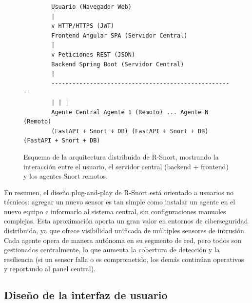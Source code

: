 \documentclass[11pt,a4paper,twoside]{report}
\begin{document}
\begin{figure}[h!]
	\centering
	\begin{verbatim}
		Usuario (Navegador Web)
		|
		v HTTP/HTTPS (JWT)
		Frontend Angular SPA (Servidor Central)
		|
		v Peticiones REST (JSON)
		Backend Spring Boot (Servidor Central)
		|
		-----------------------------------------------------
		| | |
		Agente Central Agente 1 (Remoto) ... Agente N (Remoto)
		(FastAPI + Snort + DB) (FastAPI + Snort + DB) (FastAPI + Snort + DB)
	\end{verbatim}
	\caption{Esquema de la arquitectura distribuida de R-Snort, mostrando la interacción entre el usuario, el servidor central (backend + frontend) y los agentes Snort remotos.}
	\label{fig:arquitectura}
\end{figure}

En resumen, el diseño plug-and-play de R-Snort está orientado a usuarios no técnicos: agregar un nuevo sensor es tan simple como instalar un agente en el nuevo equipo e informarlo al sistema central, sin configuraciones manuales complejas. Esta aproximación aporta un gran valor en entornos de ciberseguridad distribuida, ya que ofrece visibilidad unificada de múltiples sensores de intrusión. Cada agente opera de manera autónoma en su segmento de red, pero todos son gestionados centralmente, lo que aumenta la cobertura de detección y la resiliencia (si un sensor falla o es comprometido, los demás continúan operativos y reportando al panel central).

\subsection{Diseño de la interfaz de usuario}
\end{document}
